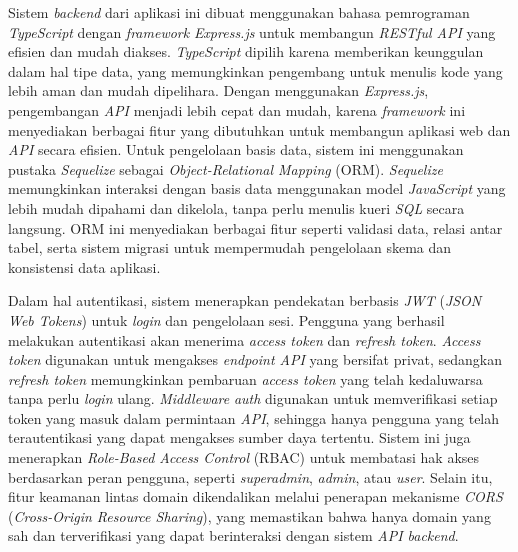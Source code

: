 Sistem \emph{backend} dari aplikasi ini dibuat menggunakan bahasa pemrograman \emph{TypeScript} dengan \emph{framework} \emph{Express.js} untuk membangun \emph{RESTful API} yang efisien dan mudah diakses. \emph{TypeScript} dipilih karena memberikan keunggulan dalam hal tipe data, yang memungkinkan pengembang untuk menulis kode yang lebih aman dan mudah dipelihara. Dengan menggunakan \emph{Express.js}, pengembangan \emph{API} menjadi lebih cepat dan mudah, karena \emph{framework} ini menyediakan berbagai fitur yang dibutuhkan untuk membangun aplikasi web dan \emph{API} secara efisien. Untuk pengelolaan basis data, sistem ini menggunakan pustaka \emph{Sequelize} sebagai \emph{Object-Relational Mapping} (ORM). \emph{Sequelize} memungkinkan interaksi dengan basis data menggunakan model \emph{JavaScript} yang lebih mudah dipahami dan dikelola, tanpa perlu menulis kueri \emph{SQL} secara langsung. ORM ini menyediakan berbagai fitur seperti validasi data, relasi antar tabel, serta sistem migrasi untuk mempermudah pengelolaan skema dan konsistensi data aplikasi.

Dalam hal autentikasi, sistem menerapkan pendekatan berbasis \emph{JWT} (\emph{JSON Web Tokens}) untuk \emph{login} dan pengelolaan sesi. Pengguna yang berhasil melakukan autentikasi akan menerima \emph{access token} dan \emph{refresh token}. \emph{Access token} digunakan untuk mengakses \emph{endpoint API} yang bersifat privat, sedangkan \emph{refresh token} memungkinkan pembaruan \emph{access token} yang telah kedaluwarsa tanpa perlu \emph{login} ulang. \emph{Middleware} \emph{auth} digunakan untuk memverifikasi setiap token yang masuk dalam permintaan \emph{API}, sehingga hanya pengguna yang telah terautentikasi yang dapat mengakses sumber daya tertentu. Sistem ini juga menerapkan \emph{Role-Based Access Control} (RBAC) untuk membatasi hak akses berdasarkan peran pengguna, seperti \emph{superadmin}, \emph{admin}, atau \emph{user}. Selain itu, fitur keamanan lintas domain dikendalikan melalui penerapan mekanisme \emph{CORS} (\emph{Cross-Origin Resource Sharing}), yang memastikan bahwa hanya domain yang sah dan terverifikasi yang dapat berinteraksi dengan sistem \emph{API backend}.

